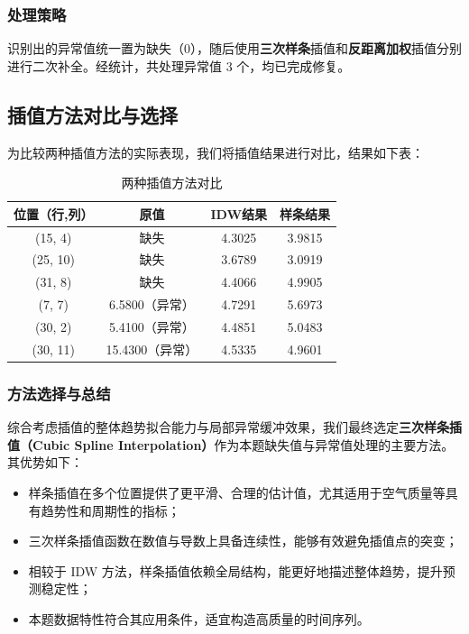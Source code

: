 \documentclass[a4paper,12pt]{article}
\begin{document}
	\subsubsection{处理策略}
	
	识别出的异常值统一置为缺失（0），随后使用\textbf{三次样条}插值和\textbf{反距离加权}插值分别进行二次补全。经统计，共处理异常值 3 个，均已完成修复。
	
	\subsection{插值方法对比与选择}
	
	为比较两种插值方法的实际表现，我们将插值结果进行对比，结果如下表：
	
	\begin{table}[h]
		\centering
		\renewcommand{\arraystretch}{1.2}
		\begin{tabular}{cccc}
			\toprule
			位置（行,列） & 原值 & IDW结果 & 样条结果 \\
			\midrule
			(15, 4)  & 缺失    & 4.3025  & 3.9815 \\
			(25, 10) & 缺失    & 3.6789  & 3.0919 \\
			(31, 8)  & 缺失    & 4.4066  & 4.9905 \\
			(7, 7)   & 6.5800（异常） & 4.7291  & 5.6973 \\
			(30, 2)  & 5.4100（异常） & 4.4851  & 5.0483 \\
			(30, 11) & 15.4300（异常）& 4.5335  & 4.9601 \\
			\bottomrule
		\end{tabular}
		\caption{两种插值方法对比}
		\label{tab:interp_compare}
	\end{table}
	
	\subsubsection*{方法选择与总结}
	
	综合考虑插值的整体趋势拟合能力与局部异常缓冲效果，我们最终选定\textbf{三次样条插值（Cubic Spline Interpolation）}作为本题缺失值与异常值处理的主要方法。其优势如下：
	
	\begin{itemize}
		\item 样条插值在多个位置提供了更平滑、合理的估计值，尤其适用于空气质量等具有趋势性和周期性的指标；
		\item 三次样条插值函数在数值与导数上具备连续性，能够有效避免插值点的突变；
		\item 相较于 IDW 方法，样条插值依赖全局结构，能更好地描述整体趋势，提升预测稳定性；
		\item 本题数据特性符合其应用条件，适宜构造高质量的时间序列。
	\end{itemize}
	
\end{document}
